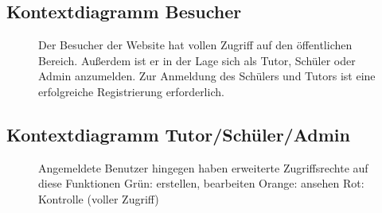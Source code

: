\documentclass[10pt,a4paper]{scrartcl}
\begin{document}
\subsection{Kontextdiagramm Besucher}
\begin{figure}[!htbp]
\caption{Der Besucher der Website hat vollen Zugriff auf den öffentlichen Bereich. Außerdem ist er in der Lage sich als Tutor, Schüler oder Admin anzumelden. Zur Anmeldung des Schülers und Tutors ist eine erfolgreiche Registrierung erforderlich.}
\end{figure}
\newpage
\subsection{Kontextdiagramm Tutor/Schüler/Admin}
\begin{figure}[!htbp]
\caption{Angemeldete Benutzer hingegen haben erweiterte Zugriffsrechte auf diese Funktionen
\newline Grün: erstellen, bearbeiten
\newline Orange: ansehen
\newline Rot: Kontrolle (voller Zugriff)}
\end{figure}

\end{document}

